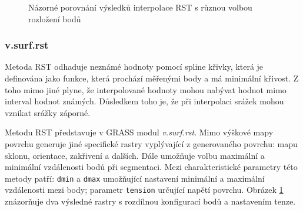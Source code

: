 \documentclass[a4paper,12pt,oneside]{report}
\begin{document}
\begin{figure}[h!]%
    \centering
    \qquad
    \caption[Interpolace RST]{Názorné porovnání  výsledků interpolace RST s různou volbou rozložení bodů \centering}%
    \label{fig:rst}%
\end{figure}
\subsubsection*{v.surf.rst}
Metoda \ac{RST} odhaduje neznámé hodnoty pomocí spline křivky, která 
je definována jako funkce, která prochází měřenými body a má minimální
 křivost. Z toho mimo jiné plyne, že interpolované hodnoty mohou nabývat 
 hodnot mimo interval hodnot známých.  Důsledkem toho je, že při interpolaci
  srážek mohou vznikat srážky záporné.


Metodu RST představuje v GRASS modul \textit{v.surf.rst}. Mimo výškové mapy
 povrchu generuje jiné  specifické rastry vyplývající z generovaného povrchu: 
 mapu sklonu, orientace, zakřivení a
dalších. Dále umožňuje volbu maximální a minimální vzdálenosti bodů
při segmentaci. Mezi charakteristické parametry této metody patří:
\texttt{dmin} a \texttt{dmax} umožňující nastavení minimální a
maximální vzdálenosti mezi body; parametr \texttt{tension} určující
napětí povrchu. Obrázek \ref{fig:rst} znázorňuje dva výsledné rastry s 
rozdílnou konfigurací bodů a nastavením tenze.
\end{document}
